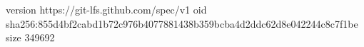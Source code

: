 version https://git-lfs.github.com/spec/v1
oid sha256:855d4bf2cabd1b72c976b4077881438b359bcba4d2ddc62d8e042244c8c7f1be
size 349692
